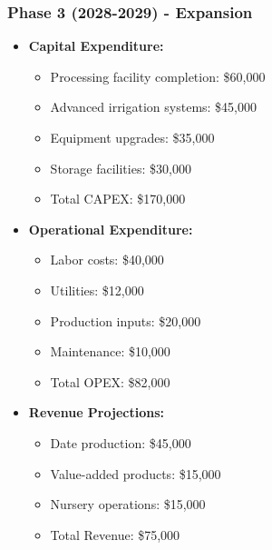 \subsubsection{Phase 3 (2028-2029) - Expansion}
\begin{itemize}
    \item \textbf{Capital Expenditure:}
    \begin{itemize}
        \item Processing facility completion: \$60,000
        \item Advanced irrigation systems: \$45,000
        \item Equipment upgrades: \$35,000
        \item Storage facilities: \$30,000
        \item Total CAPEX: \$170,000
    \end{itemize}
    \item \textbf{Operational Expenditure:}
    \begin{itemize}
        \item Labor costs: \$40,000
        \item Utilities: \$12,000
        \item Production inputs: \$20,000
        \item Maintenance: \$10,000
        \item Total OPEX: \$82,000
    \end{itemize}
    \item \textbf{Revenue Projections:}
    \begin{itemize}
        \item Date production: \$45,000
        \item Value-added products: \$15,000
        \item Nursery operations: \$15,000
        \item Total Revenue: \$75,000
    \end{itemize}
\end{itemize}

